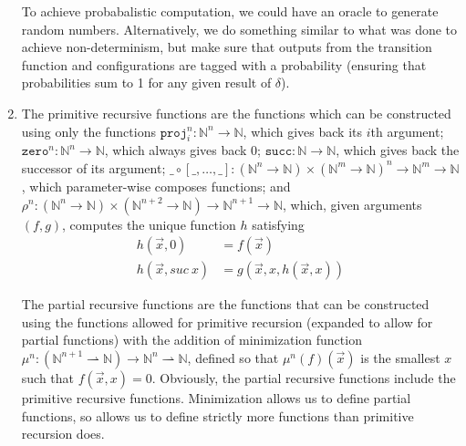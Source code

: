 \documentclass{article}
\newcommand{\parto}{\rightharpoonup}
\begin{document}
\begin{enumerate}
    To achieve probabalistic computation, we could have an oracle to generate random numbers. Alternatively, we do something similar to what was done to achieve non-determinism, but make sure that outputs from the transition function and configurations are tagged with a probability (ensuring that probabilities sum to 1 for any given result of $\delta$).
  \item The primitive recursive functions are the functions which can be constructed using only the functions $\mathtt{proj}_i^n : \mathbb N^n \to \mathbb N$, which gives back its $i$th argument; $\mathtt{zero}^n : \mathbb N^n \to \mathbb N$, which always gives back $0$; $\mathtt{succ} : \mathbb N \to \mathbb N$, which gives back the successor of its argument; $\_\circ[\_, \ldots, \_] : (\mathbb N^n \to \mathbb N) \times (\mathbb N^m \to \mathbb N)^n \to \mathbb N^m \to \mathbb N$, which parameter-wise composes functions; and $\rho^n : (\mathbb N^n \to \mathbb N) \times (\mathbb N^{n+2} \to \mathbb N) \to \mathbb N^{n+1} \to \mathbb N$, which, given arguments $(f, g)$, computes the unique function $h$ satisfying
    \begin{align*}
      h(\vec x, 0) & = f(\vec x)
      \\
      h(\vec x, \mathit{suc}~x) & = g(\vec x, x, h(\vec x, x))
    \end{align*}

    The partial recursive functions are the functions that can be constructed using the functions allowed for primitive recursion (expanded to allow for partial functions) with the addition of minimization function $\mu^n : (\mathbb N^{n+1} \parto \mathbb N) \to \mathbb N^n \parto \mathbb N$, defined so that $\mu^n(f)(\vec x)$ is the smallest $x$ such that $f(\vec x, x) = 0$. Obviously, the partial recursive functions include the primitive recursive functions. Minimization allows us to define partial functions, so allows us to define strictly more functions than primitive recursion does.


\end{enumerate}
\end{document}
